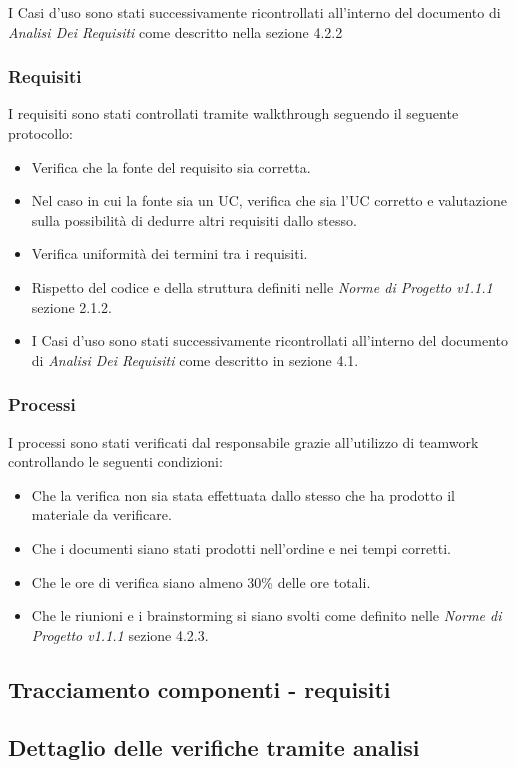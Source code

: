 \documentclass[a4paper]{article}
\begin{document}
				I Casi d'uso sono stati successivamente ricontrollati all'interno del documento di \emph{Analisi Dei Requisiti} come
				descritto nella sezione 4.2.2
			\subsubsection{Requisiti}
				I requisiti sono stati controllati tramite walkthrough seguendo il seguente protocollo:
					\begin{itemize}
						\item Verifica che la fonte del requisito sia corretta.
						\item Nel caso in cui la fonte sia un UC, verifica che sia l’UC corretto e valutazione
	 sulla possibilità di dedurre altri requisiti dallo stesso.
						\item Verifica uniformità dei termini tra i requisiti.
						\item Rispetto del codice e della struttura definiti nelle \emph{Norme di Progetto v1.1.1} sezione 2.1.2.
						\item I Casi d'uso sono stati successivamente ricontrollati all'interno del documento di \emph{Analisi Dei Requisiti} 
						come descritto in sezione 4.1.
					\end{itemize}
			\subsubsection{Processi}
				I processi sono stati verificati dal responsabile grazie all'utilizzo di teamwork controllando le seguenti condizioni:
				\begin{itemize}
					\item Che la verifica non sia stata effettuata dallo stesso che ha prodotto il materiale da verificare.
					\item Che i documenti siano stati prodotti nell'ordine e nei tempi corretti.
					\item Che le ore di verifica siano almeno 30\% delle ore totali.
					\item Che le riunioni e i brainstorming si siano svolti come definito nelle \emph{Norme di Progetto v1.1.1} sezione 4.2.3.
				\end{itemize}
				
		\subsection{Tracciamento componenti - requisiti}
		
		\subsection{Dettaglio delle verifiche tramite analisi}
\end{document}
